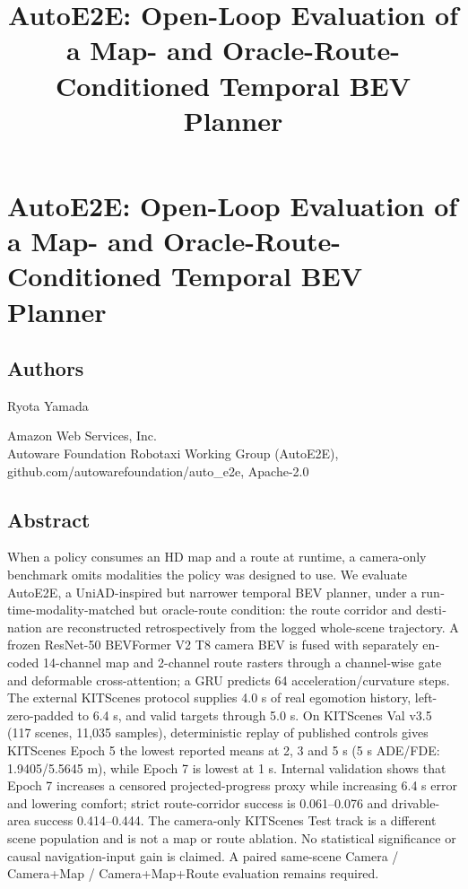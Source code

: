 \documentclass[
  english,
  10pt,
]{article}
\title{AutoE2E: Open-Loop Evaluation of a Map- and
Oracle-Route-Conditioned Temporal BEV Planner}
\author{}
\date{}
\begin{document}
\maketitle

\section{AutoE2E: Open-Loop Evaluation of a Map- and
Oracle-Route-Conditioned Temporal BEV
Planner}\label{autoe2e-open-loop-evaluation-of-a-map--and-oracle-route-conditioned-temporal-bev-planner}

\subsection{Authors}\label{authors}

Ryota Yamada

Amazon Web Services, Inc.\\
Autoware Foundation Robotaxi Working Group (AutoE2E),
github.com/autowarefoundation/auto\_e2e, Apache-2.0

\begin{otherlanguage}{english}

\subsection{Abstract}\label{abstract}

When a policy consumes an HD map and a route at runtime, a camera-only
benchmark omits modalities the policy was designed to use. We evaluate
AutoE2E, a UniAD-inspired but narrower temporal BEV planner, under a
runtime-modality-matched but oracle-route condition: the route corridor
and destination are reconstructed retrospectively from the logged
whole-scene trajectory. A frozen ResNet-50 BEVFormer V2 T8 camera BEV is
fused with separately encoded 14-channel map and 2-channel route rasters
through a channel-wise gate and deformable cross-attention; a GRU
predicts 64 acceleration/curvature steps. The external KITScenes
protocol supplies 4.0 s of real egomotion history, left-zero-padded to
6.4 s, and valid targets through 5.0 s. On KITScenes Val v3.5 (117
scenes, 11,035 samples), deterministic replay of published controls
gives KITScenes Epoch 5 the lowest reported means at 2, 3 and 5 s (5 s
ADE/FDE: 1.9405/5.5645 m), while Epoch 7 is lowest at 1 s. Internal
validation shows that Epoch 7 increases a censored projected-progress
proxy while increasing 6.4 s error and lowering comfort; strict
route-corridor success is 0.061--0.076 and drivable-area success
0.414--0.444. The camera-only KITScenes Test track is a different scene
population and is not a map or route ablation. No statistical
significance or causal navigation-input gain is claimed. A paired
same-scene Camera / Camera+Map / Camera+Map+Route evaluation remains
required.

\end{otherlanguage}
\end{document}

